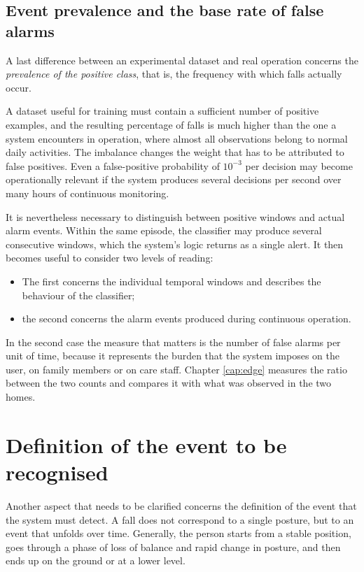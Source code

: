 \subsection{Event prevalence and the base rate of false alarms}

A last difference between an experimental dataset and real operation concerns
the \emph{prevalence of the positive class}, that is, the frequency with which falls actually occur.

A dataset useful for training must contain a sufficient number of positive
examples, and the resulting percentage of falls is much higher than the one a
system encounters in operation, where almost all observations belong to normal
daily activities. The imbalance changes the weight that has to be attributed to
false positives.
Even a false-positive probability of $10^{-3}$ per decision may become operationally relevant if the system
produces several decisions per second over many hours of continuous monitoring.

It is nevertheless necessary to distinguish between positive windows and
actual alarm events. Within the same episode, the classifier may produce several consecutive windows, which the system's logic returns as a single alert.
It then becomes useful to consider two levels of reading:
\begin{itemize}
    \item [-] The first concerns the individual temporal windows and describes
          the behaviour of the classifier;
    \item [-] the second concerns the alarm events produced during continuous
          operation.
\end{itemize}
In the second case the measure that matters is the number of false alarms per
unit of time, because it represents the burden that the system imposes on the
user, on family members or on care staff. Chapter \ref{cap:edge} measures the ratio between the two counts and compares it with what was observed in the two homes.

\section{Definition of the event to be recognised}

Another aspect that needs to be clarified concerns the definition of the event that the system must detect.
A fall does not correspond to a single posture, but to an event that unfolds over time. Generally, the person starts from a stable position, goes through a phase of loss of balance and rapid change in posture, and then ends up on the ground or at a lower level.

